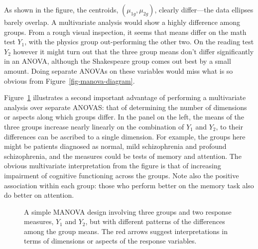 \documentclass[
  letterpaper,
  10pt,
  krantz2]{krantz}
\begin{document}
As shown in the figure, the centroids, \((\mu_{1g}, \mu_{2g})\), clearly
differ---the data ellipses barely overlap. A multivariate analysis would
show a highly difference among groups. From a rough visual inspection,
it seems that means differ on the math test \(Y_1\), with the physics
group out-performing the other two. On the reading test \(Y_2\) however
it might turn out that the three group means don't differ significantly
in an ANOVA, although the Shakespeare group comes out best by a small
amount. Doing separate ANOVAs on these variables would miss what is so
obvious from Figure~\ref{fig-manova-diagram}.

Figure~\ref{fig-manova-response-dimensions} illustrates a second
important advantage of performing a multivariate analysis over separate
ANOVAS: that of determining the number of dimensions or aspects along
which groups differ. In the panel on the left, the means of the three
groups increase nearly linearly on the combination of \(Y_1\) and
\(Y_2\), to their differences can be ascribed to a single dimension. For
example, the groups here might be patients diagnosed as normal, mild
schizophrenia and profound schizophrenia, and the measures could be
tests of memory and attention. The obvious multivariate interpretation
from the figure is that of increasing impairment of cognitive
functioning across the groups. Note also the positive association within
each group: those who perform better on the memory task also do better
on attention.

\begin{figure}


\caption{\label{fig-manova-response-dimensions}A simple MANOVA design
involving three groups and two response measures, \(Y_1\) and \(Y_2\),
but with different patterns of the differences among the group means.
The red arrows suggest interpretations in terms of dimensions or aspects
of the response variables.}

\end{figure}%
\end{document}
